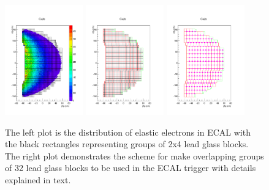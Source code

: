 \documentclass{article}
\begin{document}
 
 \begin{figure}
 	\centering
 	\includegraphics[width=0.3\textwidth]{cfpbox.pdf}
 	\includegraphics[width=0.3\textwidth]{cfpc.pdf}
 	 	\includegraphics[width=0.3\textwidth]{cgr32.pdf}
 	 	\caption{The left plot is the distribution of elastic electrons in ECAL with the black rectangles representing
 		groups of 2x4 lead glass blocks. The right plot demonstrates
 		the scheme for make overlapping groups of 32 lead glass blocks to be used in the ECAL trigger with
 		details explained in text.  }\label{fig:ECALTrig}
 \end{figure}
\end{document}
